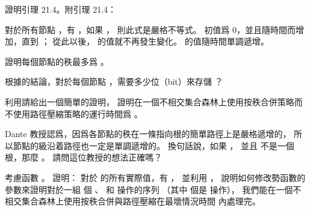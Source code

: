 \startsection[
  title={Analysis of union by rank with path compression},
]

\startEXERCISE
證明引理 21.4。附引理 21.4：

對於所有節點 ，有 ，如果 ，
則此式是嚴格不等式。  初值爲 0，並且隨時間而增加，直到 ；
從此以後，  的值就不再發生變化。
  的值隨時間單調遞增。
\stopEXERCISE

\startANSWER
{}
\stopANSWER

\startEXERCISE[exercise:21.4-2]
證明每個節點的秩最多爲 。
\stopEXERCISE

\startANSWER
{}
\stopANSWER

\startEXERCISE
根據\inexercise[21.4-2] 的結論，對於每個節點 ，需要多少位（bit）來存儲 ？
\stopEXERCISE

\startANSWER
{}
\stopANSWER

\startEXERCISE
利用\inexercise[21.4-2] 請給出一個簡單的證明，
證明在一個不相交集合森林上使用按秩合併策略而不使用路徑壓縮策略的運行時間爲 。
\stopEXERCISE

\startANSWER
{}
\stopANSWER

\startEXERCISE
Dante 教授認爲，因爲各節點的秩在一條指向根的簡單路徑上是嚴格遞增的，
所以節點的級沿着路徑也一定是單調遞增的。
換句話說，如果 ，
並且  不是一個根，那麼 。
請問這位教授的想法正確嗎？
\stopEXERCISE

\startANSWER
{}
\stopANSWER

\startEXERCISE\DIFFICULT
考慮函數 。
證明：
對於  的所有實際值，有 ，
並利用 \inexercise[21.4-2]，
說明如何修改勢函數的參數來證明對於一組  個 、  和  操作的序列
（其中  個是  操作），
我們能在一個不相交集合森林上使用按秩合併與路徑壓縮在最壞情況時間  內處理完。
\stopEXERCISE

\startANSWER
{}
\stopANSWER

\stopsection
